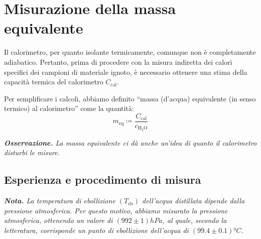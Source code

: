 \documentclass{article}
\begin{document}
\section{Misurazione della massa equivalente}

Il calorimetro, per quanto isolante termicamente, comunque non è completamente
adiabatico. Pertanto, prima di procedere con la misura indiretta dei calori
specifici dei campioni di materiale ignoto, è necessario ottenere una stima
della capacità termica del calorimetro $C_\text{cal}$.

Per semplificare i calcoli, abbiamo definito “massa (d'acqua) equivalente
(in senso termico) al calorimetro” come la quantità:
\[m_\text{eq} \coloneqq \frac{C_\text{cal}}{c_{\text{H}_2\text{O}}}\]

\emph{
\textbf{Osservazione.} La massa equivalente ci dà anche un'idea di
quanto il calorimetro disturbi le misure.
}

\subsection{Esperienza e procedimento di misura}

\emph{
\textbf{Nota.} La temperatura di ebollizione $(T_\text{eb})$ dell'acqua distillata
dipende dalla pressione atmosferica. Per questo motivo, abbiamo misurato la pressione
atmosferica, ottenendo un valore di $\left(992\pm1\right)\unit{hPa}$, al quale, secondo la
letteratura, corrisponde un punto di ebollizione dell'acqua di $\left(99.4\pm0.1\right)\unit{\degree C}$.
}
\end{document}
